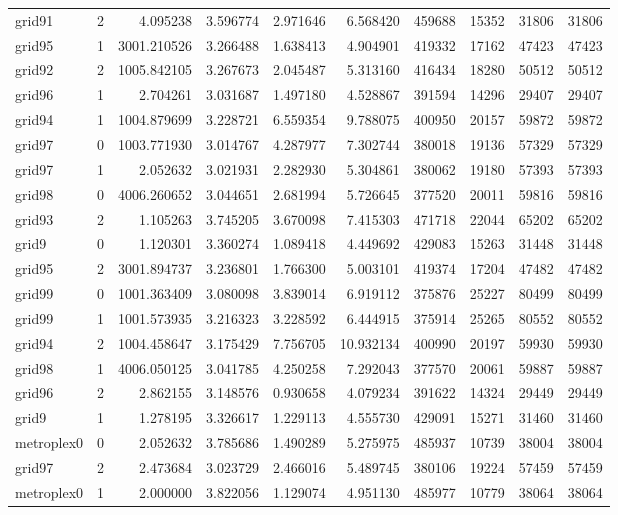 \begin{longtable}{|l|r|r|r|r|r|r|r|r|r|}
grid91 & 2 & 4.095238 & 3.596774 & 2.971646 & 6.568420 & 459688 & 15352 & 31806 & 31806 \\
grid95 & 1 & 3001.210526 & 3.266488 & 1.638413 & 4.904901 & 419332 & 17162 & 47423 & 47423 \\
grid92 & 2 & 1005.842105 & 3.267673 & 2.045487 & 5.313160 & 416434 & 18280 & 50512 & 50512 \\
grid96 & 1 & 2.704261 & 3.031687 & 1.497180 & 4.528867 & 391594 & 14296 & 29407 & 29407 \\
grid94 & 1 & 1004.879699 & 3.228721 & 6.559354 & 9.788075 & 400950 & 20157 & 59872 & 59872 \\
grid97 & 0 & 1003.771930 & 3.014767 & 4.287977 & 7.302744 & 380018 & 19136 & 57329 & 57329 \\
grid97 & 1 & 2.052632 & 3.021931 & 2.282930 & 5.304861 & 380062 & 19180 & 57393 & 57393 \\
grid98 & 0 & 4006.260652 & 3.044651 & 2.681994 & 5.726645 & 377520 & 20011 & 59816 & 59816 \\
grid93 & 2 & 1.105263 & 3.745205 & 3.670098 & 7.415303 & 471718 & 22044 & 65202 & 65202 \\
grid9 & 0 & 1.120301 & 3.360274 & 1.089418 & 4.449692 & 429083 & 15263 & 31448 & 31448 \\
grid95 & 2 & 3001.894737 & 3.236801 & 1.766300 & 5.003101 & 419374 & 17204 & 47482 & 47482 \\
grid99 & 0 & 1001.363409 & 3.080098 & 3.839014 & 6.919112 & 375876 & 25227 & 80499 & 80499 \\
grid99 & 1 & 1001.573935 & 3.216323 & 3.228592 & 6.444915 & 375914 & 25265 & 80552 & 80552 \\
grid94 & 2 & 1004.458647 & 3.175429 & 7.756705 & 10.932134 & 400990 & 20197 & 59930 & 59930 \\
grid98 & 1 & 4006.050125 & 3.041785 & 4.250258 & 7.292043 & 377570 & 20061 & 59887 & 59887 \\
grid96 & 2 & 2.862155 & 3.148576 & 0.930658 & 4.079234 & 391622 & 14324 & 29449 & 29449 \\
grid9 & 1 & 1.278195 & 3.326617 & 1.229113 & 4.555730 & 429091 & 15271 & 31460 & 31460 \\
metroplex0 & 0 & 2.052632 & 3.785686 & 1.490289 & 5.275975 & 485937 & 10739 & 38004 & 38004 \\
grid97 & 2 & 2.473684 & 3.023729 & 2.466016 & 5.489745 & 380106 & 19224 & 57459 & 57459 \\
metroplex0 & 1 & 2.000000 & 3.822056 & 1.129074 & 4.951130 & 485977 & 10779 & 38064 & 38064 \\

\end{longtable}
